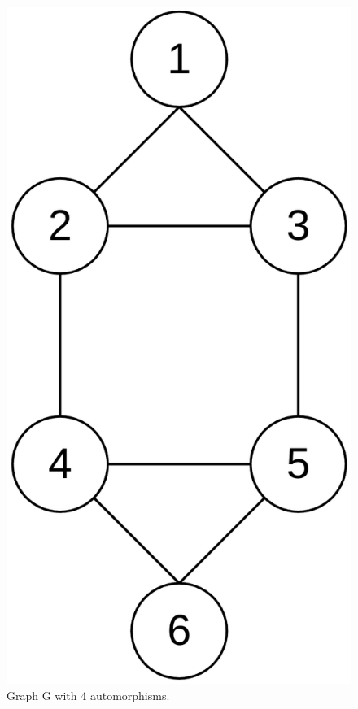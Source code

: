 \begin{figure}[H]
\begin{center}
\includegraphics[scale=0.2,keepaspectratio]{images/cycle_notation_graph.png}
\end{center}
\caption{Graph G with 4 automorphisms.}
\label{fig:cycle_notation_graph}
\end{figure}

